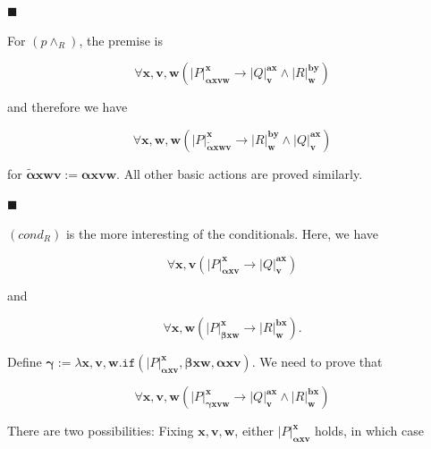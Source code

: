 \documentclass[10pt,a4paper]{article}
\begin{document}
 
\par\noindent  $\blacksquare$ 
 
For $(p\wedge_{R})$, the premise is\par
  
\par  \quad  \[\forall\bm{x},\bm{v},\bm{w}\left(|{P}|^{\bm{x}}_{\bm{\alpha}\bm{x}\bm{v}\bm{w}}\to|{Q}|^{\bm{a}\bm{x}}_{\bm{v}}\wedge|{R}|^{\bm{b}\bm{y}}_{\bm{w}}\right)\]\quad  \quad  
  
and therefore we have\par
  
\par  \quad  \[\forall\bm{x},\bm{w},\bm{w}\left(|{P}|^{\bm{x}}_{\tilde{\bm{\alpha}}\bm{x}\bm{w}\bm{v}}\to|{R}|^{\bm{b}\bm{y}}_{\bm{w}}\wedge|{Q}|^{\bm{a}\bm{x}}_{\bm{v}}\right)\]\quad  \quad  
  
for $\tilde{\bm{\alpha}}\bm{x}\bm{w}\bm{v}:=\bm{\alpha}\bm{x}\bm{v}\bm{w}$. All other basic actions are proved similarly.\par
 
 
 
\par\noindent  $\blacksquare$ 
 
$(cond_{R})$ is the more interesting of the conditionals. Here, we have\par
  
\par  \quad  \[\forall\bm{x},\bm{v}\left(|{P}|^{\bm{x}}_{\bm{\alpha}\bm{x}\bm{v}}\to|{Q}|^{\bm{a}\bm{x}}_{\bm{v}}\right)\]\quad  \quad  
  
and\par
  
\par  \quad  \[\forall\bm{x},\bm{w}\left(|{P}|^{\bm{x}}_{\bm{\beta}\bm{x}\bm{w}}\to|{R}|^{\bm{b}\bm{x}}_{\bm{w}}\right).\]\quad  \quad  
  
Define $\bm{\gamma}:=\lambda\bm{x},\bm{v},\bm{w}.\mathtt{if}({|{P}|^{\bm{x}}_{\bm{\alpha}\bm{x}\bm{v}}},{\bm{\beta}\bm{x}\bm{w}},{\bm{\alpha}\bm{x}\bm{v}})$. We need to prove that\par
  
\par  \quad  \[\forall\bm{x},\bm{v},\bm{w}\left(|{P}|^{\bm{x}}_{\bm{\gamma}\bm{x}\bm{v}\bm{w}}\to|{Q}|^{\bm{a}\bm{x}}_{\bm{v}}\wedge|{R}|^{\bm{b}\bm{x}}_{\bm{w}}\right)\]\quad  \quad  
  
There are two possibilities: Fixing $\bm{x},\bm{v},\bm{w}$, either $|{P}|^{\bm{x}}_{\bm{\alpha}\bm{x}\bm{v}}$ holds, in which case\par
  
\end{document}
